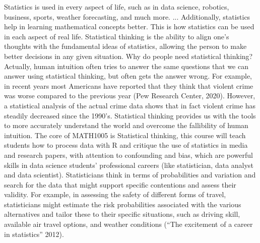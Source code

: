 \documentclass[12pt]{article}
\begin{document}
Statistics is used in every aspect of life, such as in data science, robotics, business, sports, weather forecasting, and much more. ... Additionally, statistics help in learning mathematical concepts better. This is how statistics can be used in each aspect of real life. Statistical thinking is the ability to align one’s thoughts with the fundamental ideas of statistics, allowing the person to make better decisions in any given situation. Why do people need statistical thinking? Actually, human intuition often tries to answer the same questions that we can answer using statistical thinking, but often gets the answer wrong. For example, in recent years most Americans have reported that they think that violent crime was worse compared to the previous year (Pew Research Center, 2020). However, a statistical analysis of the actual crime data shows that in fact violent crime has steadily decreased since the 1990’s. Statistical thinking provides us with the tools to more accurately understand the world and overcome the fallibility of human intuition. The core of MATH1005 is Statistical thinking, this course will teach students how to process data with R and critique the use of statistics in media and research papers, with attention to confounding and bias, which are powerful skills in data science students' professional careers (like statistician, data analyst and data scientist). Statisticians think in terms of probabilities and variation and search for the data that might support specific contentions and assess their validity. For example, in assessing the safety of different forms of travel, statisticians might estimate the risk probabilities associated with the various alternatives and tailor these to their specific situations, such as driving skill, available air travel options, and weather conditions (“The excitement of a career in statistics” 2012).
\end{document}
